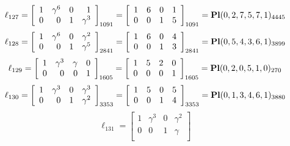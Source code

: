 \documentclass{article}
\begin{document}
{$$
\ell_{127} = 
\left[
\begin{array}{*{4}{r}}
1 & \gamma^{6} & 0 & 1\\
0 & 0 & 1 & \gamma^{3}\\
\end{array}
\right]
_{1091}
=
\left[
\begin{array}{*{4}c}
1  & 6  & 0  & 1\\
0  & 0  & 1  & 5\\
\end{array}
\right]_{1091}
={\rm\bf Pl}(0,2,7,5,7,1 )_{4445}$$
$$
\ell_{128} = 
\left[
\begin{array}{*{4}{r}}
1 & \gamma^{6} & 0 & \gamma^{2}\\
0 & 0 & 1 & \gamma^{5}\\
\end{array}
\right]
_{2841}
=
\left[
\begin{array}{*{4}c}
1  & 6  & 0  & 4\\
0  & 0  & 1  & 3\\
\end{array}
\right]_{2841}
={\rm\bf Pl}(0,5,4,3,6,1 )_{3899}$$
$$
\ell_{129} = 
\left[
\begin{array}{*{4}{r}}
1 & \gamma^{3} & \gamma  & 0\\
0 & 0 & 0 & 1\\
\end{array}
\right]
_{1605}
=
\left[
\begin{array}{*{4}c}
1  & 5  & 2  & 0\\
0  & 0  & 0  & 1\\
\end{array}
\right]_{1605}
={\rm\bf Pl}(0,2,0,5,1,0 )_{270}$$
$$
\ell_{130} = 
\left[
\begin{array}{*{4}{r}}
1 & \gamma^{3} & 0 & \gamma^{3}\\
0 & 0 & 1 & \gamma^{2}\\
\end{array}
\right]
_{3353}
=
\left[
\begin{array}{*{4}c}
1  & 5  & 0  & 5\\
0  & 0  & 1  & 4\\
\end{array}
\right]_{3353}
={\rm\bf Pl}(0,1,3,4,6,1 )_{3880}$$
$$
\ell_{131} = 
\left[
\begin{array}{*{4}{r}}
1 & \gamma^{3} & 0 & \gamma^{2}\\
0 & 0 & 1 & \gamma \\
\end{array}
\right]
$$}
\end{document}
